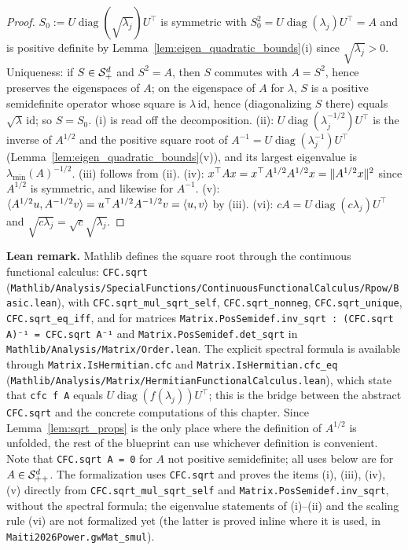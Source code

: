 \begin{proof}
$S_0 := U\operatorname{diag}(\sqrt{\lambda_j})U^\top$ is symmetric with $S_0^2 =
U\operatorname{diag}(\lambda_j)U^\top = A$ and is positive definite by
Lemma~\ref{lem:eigen_quadratic_bounds}(i) since $\sqrt{\lambda_j} > 0$. Uniqueness: if $S \in
\mathcal{S}_{+}^{d}$ and $S^2 = A$, then $S$ commutes with $A = S^2$, hence preserves the eigenspaces of $A$;
on the eigenspace of $A$ for $\lambda$, $S$ is a positive semidefinite operator whose square is
$\lambda\,\mathrm{id}$, hence (diagonalizing $S$ there) equals $\sqrt\lambda\,\mathrm{id}$; so
$S = S_0$. (i) is read off the decomposition. (ii): $U\operatorname{diag}(\lambda_j^{-1/2})U^\top$
is the inverse of $A^{1/2}$ and the positive square root of $A^{-1} =
U\operatorname{diag}(\lambda_j^{-1})U^\top$ (Lemma~\ref{lem:eigen_quadratic_bounds}(v)), and its
largest eigenvalue is $\lambda_{\min}(A)^{-1/2}$. (iii) follows from (ii). (iv): $x^\top A x =
x^\top A^{1/2} A^{1/2} x = \lVert A^{1/2}x \rVert^2$ since $A^{1/2}$ is symmetric, and likewise for
$A^{-1}$. (v): $\langle A^{1/2}u, A^{-1/2}v \rangle = u^\top A^{1/2}A^{-1/2} v = \langle u, v \rangle$ by (iii).
(vi): $cA = U\operatorname{diag}(c\lambda_j)U^\top$ and $\sqrt{c\lambda_j} = \sqrt c\sqrt{\lambda_j}$.
\end{proof}

\textbf{Lean remark.} Mathlib defines the square root through the continuous functional
calculus: \texttt{CFC.sqrt} (\texttt{Mathlib/Analysis/SpecialFunctions/ContinuousFunctionalCalculus/Rpow/Basic.lean}),
with \texttt{CFC.sqrt\_mul\_sqrt\_self}, \texttt{CFC.sqrt\_nonneg}, \texttt{CFC.sqrt\_unique},
\texttt{CFC.sqrt\_eq\_iff}, and for matrices \texttt{Matrix.PosSemidef.inv\_sqrt :
(CFC.sqrt A)⁻¹ = CFC.sqrt A⁻¹} and \texttt{Matrix.PosSemidef.det\_sqrt} in
\texttt{Mathlib/Analysis/Matrix/Order.lean}. The explicit spectral formula is available through
\texttt{Matrix.IsHermitian.cfc} and \texttt{Matrix.IsHermitian.cfc\_eq}
(\texttt{Mathlib/Analysis/Matrix/HermitianFunctionalCalculus.lean}), which state that \texttt{cfc f A} equals $U\operatorname{diag}(f(\lambda_j))U^\top$; this is
the bridge between the abstract \texttt{CFC.sqrt} and the concrete computations of this chapter.
Since Lemma~\ref{lem:sqrt_props} is the only place where the definition of $A^{1/2}$ is unfolded,
the rest of the blueprint can use whichever definition is convenient. Note that
\texttt{CFC.sqrt A = 0} for $A$ not positive semidefinite; all uses below are for $A \in \mathcal{S}_{++}^{d}$.
The formalization uses \texttt{CFC.sqrt} and proves the items (i), (iii), (iv), (v) directly from
\texttt{CFC.sqrt\_mul\_sqrt\_self} and \texttt{Matrix.PosSemidef.inv\_sqrt}, without the spectral
formula; the eigenvalue statements of (i)--(ii) and the scaling rule (vi) are not formalized yet
(the latter is proved inline where it is used, in \texttt{Maiti2026Power.gwMat\_smul}).

